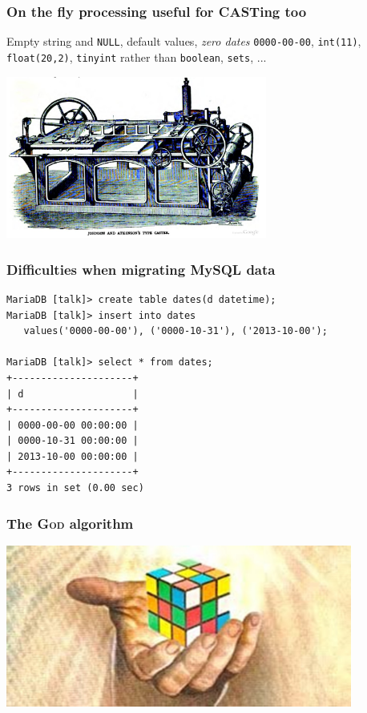 \documentclass{beamer}
\begin{document}
\begin{frame}
  \frametitle{On the fly processing useful for CASTing too}

  Empty string and \texttt{NULL}, default values, \textit{zero
    dates} \texttt{0000-00-00}, \texttt{int(11)}, \texttt{float(20,2)},
  \texttt{tinyint} rather than \texttt{boolean}, \texttt{sets}, ...

  \vfill
   \vfill
  
  \begin{center}
    \includegraphics[height=2.1in]{type-casting-machine.jpg}
  \end{center}
\end{frame}

\begin{frame}[fragile]
  \frametitle{Difficulties when migrating MySQL data}
  
  \vfill

\begin{verbatim}
MariaDB [talk]> create table dates(d datetime);
MariaDB [talk]> insert into dates
   values('0000-00-00'), ('0000-10-31'), ('2013-10-00');

MariaDB [talk]> select * from dates;
+---------------------+
| d                   |
+---------------------+
| 0000-00-00 00:00:00 |
| 0000-10-31 00:00:00 |
| 2013-10-00 00:00:00 |
+---------------------+
3 rows in set (0.00 sec)
\end{verbatim}
\end{frame}

\begin{frame}[fragile]
  \frametitle{The \textsc{God} algorithm}

  \begin{center}
    \includegraphics[height=2.1in]{god-has-spoken-algorithm-reveals-secret-number-for-rubiks-cube.jpg}
  \end{center}
\end{frame}
\end{document}
